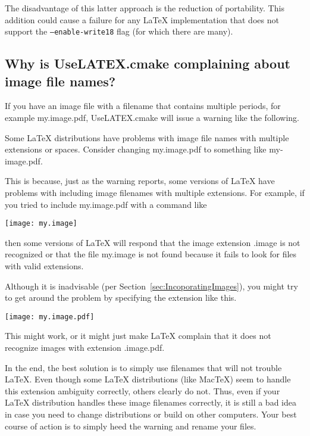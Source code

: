 \documentclass{article}
\newcommand*{\textfile}[1]{\textsf{#1}}
\newcommand*{\textcmake}[1]{\texttt{#1}}
\newcommand*{\UseLATEX}{\textfile{UseLATEX.cmake}\xspace}
\newcommand*{\latex}{\LaTeX\xspace}
\newcommand*{\mactex}{Mac\TeX\xspace}
\begin{document}
  The disadvantage of this latter approach is the reduction of portability.
  This addition could cause a failure for any \latex implementation that
  does not support the \textcmake{--enable-write18} flag (for which there
  are many).

  \subsection{Why is \UseLATEX complaining about image file names?}
  \label{sec:Why_is_UseLATEX_complaining_about_image_file_names}

  If you have an image file with a filename that contains multiple periods,
  for example \textfile{my.image.pdf}, \UseLATEX will issue a warning like
  the following.

  \begin{CodeListing}
Some LaTeX distributions have problems with image file names
with multiple extensions or spaces.  Consider changing
my.image.pdf to something like my-image.pdf.
  \end{CodeListing}

  This is because, just as the warning reports, some versions of \latex
  have problems with including image filenames with multiple extensions.
  For example, if you tried to include \textfile{my.image.pdf} with a
  command like
  \begin{CodeListing}
\texttt{[image: my.image]}
  \end{CodeListing}
  then some versions of \latex will respond that the image extension
  \textfile{.image} is not recognized or that the file \textfile{my.image}
  is not found because it fails to look for files with valid extensions.

  Although it is inadvisable (per Section~\ref{sec:IncoporatingImages}),
  you might try to get around the problem by specifying the extension like
  this.
  \begin{CodeListing}
\texttt{[image: my.image.pdf]}
  \end{CodeListing}
  This might work, or it might just make \latex complain that it does not
  recognize images with extension \textfile{.image.pdf}.

  In the end, the best solution is to simply use filenames that will not
  trouble \latex.  Even though some \latex distributions (like \mactex)
  seem to handle this extension ambiguity correctly, others clearly do
  not.  Thus, even if your \latex distribution handles these image
  filenames correctly, it is still a bad idea in case you need to change
  distributions or build on other computers.  Your best course of action is
  to simply heed the warning and rename your files.
\end{document}
